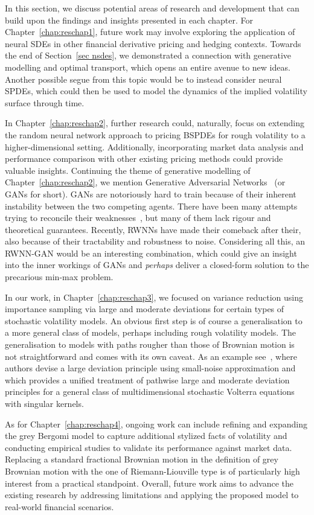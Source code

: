In this section, we discuss potential areas of research and development that can build upon the findings and insights presented in each chapter. For Chapter~\ref{chap:reschap1}, future work may involve exploring the application of neural SDEs in other financial derivative pricing and hedging contexts. Towards the end of Section~\ref{sec nsdes}, we demonstrated a connection with generative modelling and optimal transport, which opens an entire avenue to new ideas. Another possible segue from this topic would be to instead consider neural SPDEs, which could then be used to model the dynamics of the implied volatility surface through time.


In Chapter~\ref{chap:reschap2}, further research could, naturally, focus on extending the random neural network approach to pricing BSPDEs for rough volatility to a higher-dimensional setting. Additionally, incorporating market data analysis and performance comparison with other existing pricing methods could provide valuable insights. Continuing the theme of generative modelling of Chapter~\ref{chap:reschap2}, we mention Generative
Adversarial Networks~\cite{Goodfellow2020GenerativeNetworks} (or GANs for short). GANs are notoriously hard to train because of their inherent instability between the two competing
agents. There have been many attempts trying to reconcile their weaknesses~\cite{Arjovsky2017WassersteinNetworks, Li2017MMDNetwork}, but many of them lack rigour and theoretical guarantees. Recently, RWNNs have made their comeback after their, also because of their tractability and robustness to noise. Considering all this, an RWNN-GAN would be an interesting combination, which could give an insight into the inner workings of GANs and \textit{perhaps} deliver a closed-form solution to the precarious min-max problem.


In our work, in Chapter~\ref{chap:reschap3}, we focused on variance reduction using importance sampling via large and moderate
deviations for certain types of stochastic volatility models. An obvious first step is of course a generalisation to a more general class of models, perhaps including rough volatility models. The generalisation to models with paths rougher than those of Brownian motion is not straightforward and comes with its own caveat. As an example see~\cite{Jacquier2018PathwiseModel, Jacquier2022LargeSystems}, where authors devise a large deviation principle using small-noise approximation and~\cite{Jacquier2022LargeSystems} which provides a unified treatment of pathwise large and moderate deviation principles for a general class of multidimensional stochastic Volterra equations with singular kernels. 


As for Chapter~\ref{chap:reschap4}, ongoing work can include refining and expanding the grey Bergomi model to capture additional stylized facts of volatility and conducting empirical studies to validate its performance against market data. Replacing a standard fractional Brownian motion in the definition of grey Brownian motion with the one of Riemann-Liouville type is of particularly high interest from a practical standpoint. Overall, future work aims to advance the existing research by addressing limitations and applying the proposed model to real-world financial scenarios.